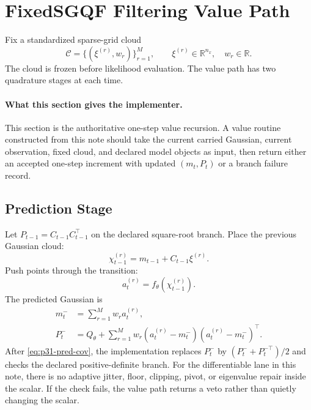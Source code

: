 \documentclass[11pt]{article}
\numberwithin{equation}{section}
\newcommand{\R}{\mathbb R}
\begin{document}
\section{FixedSGQF Filtering Value Path}
\label{sec:p31-value-path}

Fix a standardized sparse-grid cloud
\begin{equation}
  \mathcal C=\{(\xi^{(r)},w_r)\}_{r=1}^M,
  \qquad
  \xi^{(r)}\in\R^{n_x},
  \quad
  w_r\in\R.
  \label{eq:p31-cloud-for-filter}
\end{equation}
The cloud is frozen before likelihood evaluation.  The value path has two
quadrature stages at each time.

\paragraph{What this section gives the implementer.}
This section is the authoritative one-step value recursion.  A value routine
constructed from this note should take the current carried Gaussian,
current observation, fixed cloud, and declared model objects as input, then
return either an accepted one-step increment with updated \((m_t,P_t)\) or a
branch failure record.

\subsection{Prediction Stage}

Let \(P_{t-1}=C_{t-1}C_{t-1}^\top\) on the declared square-root branch.  Place
the previous Gaussian cloud:
\begin{equation}
  \chi_{t-1}^{(r)}
  =
  m_{t-1}+C_{t-1}\xi^{(r)}.
  \label{eq:p31-pred-placed-points}
\end{equation}
Push points through the transition:
\begin{equation}
  a_t^{(r)}=f_\theta(\chi_{t-1}^{(r)}).
  \label{eq:p31-transition-points}
\end{equation}
The predicted Gaussian is
\begin{align}
  m_t^-&=\sum_{r=1}^Mw_ra_t^{(r)},
  \label{eq:p31-pred-mean}\\
  P_t^-&=Q_\theta+\sum_{r=1}^Mw_r
  (a_t^{(r)}-m_t^-)(a_t^{(r)}-m_t^-)^\top.
  \label{eq:p31-pred-cov}
\end{align}
After \eqref{eq:p31-pred-cov}, the implementation replaces \(P_t^-\) by
\((P_t^-+P_t^{-\top})/2\) and checks the declared positive-definite branch.
For the differentiable lane in this note, there is no adaptive jitter, floor,
clipping, pivot, or eigenvalue repair inside the scalar.  If the check fails,
the value path returns a veto rather than quietly changing the scalar.
\end{document}
